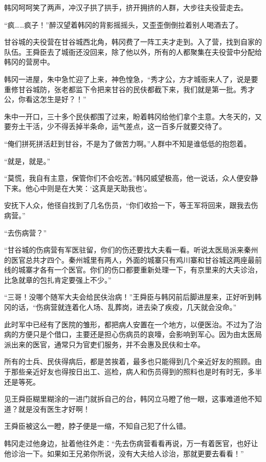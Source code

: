 韩冈呵呵笑了两声，冲汉子拱了拱手，挤开拥挤的人群，大步往夫役营走去。

“疯……疯子！”醉汉望着韩冈的背影摇摇头，又歪歪倒倒拉着别人喝酒去了。

甘谷城的夫役营在甘谷城西北角，韩冈费了一阵工夫才走到。入了营，找到自家的队伍。王舜臣去了城衙还没回来，除了他以外，所有的人都聚集在夫役营中分配给韩冈的营房中。

韩冈一进屋，朱中急忙迎了上来，神色惶急，“秀才公，方才城衙来人了，说是要重修甘谷城防，张老都监下令把来甘谷的民伕都截下来，我们就是第一批。秀才公，你看这怎生是好？！”

朱中一开口，三十多个民伕都围了过来，盼着韩冈给他们拿个主意。大冬天的，又要夯土干活，少不得丢掉半条命，运气差点，这一百多斤就要交待了。

“俺们拼死拼活赶到甘谷，不是为了做苦力啊。”人群中不知是谁低低的抱怨着。

“就是，就是。”

“莫慌，我自有主意，保管你们不会吃苦。”韩冈威望极高，他一说话，众人便安静下来。他心中则是在大笑：‘这真是天助我也’。

安抚下人众，他径自找到了几名伤员，“你们收拾一下，等王军将回来，跟我去伤病营。”

“去伤病营？”

“甘谷城的伤病营有军医驻留，你们的伤还要找大夫看一看。听说太医局派来秦州的医官总共才四个。秦州城里有两人，外面的城寨只有鸡川寨和甘谷城这两座最前线的城寨才各有一个医官。你们的伤口都要重新处理一下，有京里来的大夫诊治，比急就章的包扎肯定要强上不少。”

“三哥！没哪个随军大夫会给民伕治病！”王舜臣与韩冈前后脚进屋来，正好听到韩冈的话，“伤病营就连着化人场、乱葬岗，进去染了疾疫，几天就会没命。”

此时军中已经有了医院的雏形，都把病人安置在一个地方，以便医治。不过为了治病的方便只是个借口，主要还是担心伤病员的哀嚎，会影响到军心。因为由太医局派出来的医官，通常只为官吏们服务，并不会惠及民伕和士卒。

所有的士兵、民伕得病后，都是苦挨着，最多也只能得到几个亲近好友的照顾。由于那些亲近好友也得按日出工、巡检，病人和伤员得到的照料也是时有时无，多半还是等死。

见王舜臣糊里糊涂的一进门就拆自己的台，韩冈立马瞪了他一眼，这事难道他不知道？就是没有医生才好啊！

王舜臣被这么一瞪，脖子便是一缩，不知自己犯了什么错。

韩冈走过他身边，扯着他往外走：“先去伤病营看看再说，万一有着医官，也好让他诊治一下。如果如王兄弟你所说，没有大夫给人诊治，那就更要去看看！”

